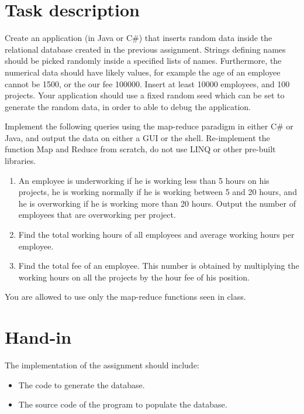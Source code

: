 \documentclass[10pt,a4paper]{article}
\begin{document}
\section*{Task description}
Create an application (in Java or C\#) that inserts random data inside the relational database created in the previous assignment. Strings defining names should be picked randomly inside a specified lists of names. Furthermore, the numerical data should have likely values, for example the age of an employee cannot be 1500, or the our fee 100000. Insert at least 10000 employees, and 100 projects. Your application should use a fixed random seed which can be set to generate the random data, in order to able to debug the application.

Implement the following queries using the map-reduce paradigm in either C\# or Java, and output the data on either a GUI or the shell. Re-implement the function Map and Reduce from scratch, do not use LINQ or other pre-built libraries.

\begin{enumerate}
	\item An employee is underworking if he is working less than 5 hours on his projects, he is working normally if he is working between 5 and 20 hours, and he is overworking if he is working more than 20 hours. Output the number of employees that are overworking per project.
	\item Find the total working hours of all employees and average working hours per employee.
	\item Find the total fee of an employee. This number is obtained by multiplying the working hours on all the projects by the hour fee of his position.
\end{enumerate}

You are allowed to use only the map-reduce functions seen in class.

\section*{Hand-in}
The implementation of the assignment should include:
\begin{itemize}
	\item The code to generate the database.
	\item The source code of the program to populate the database.
\end{itemize}
\end{document}
